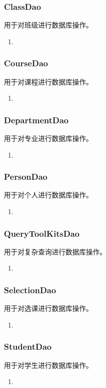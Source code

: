 \documentclass[../report.tex]{subfiles}
\begin{document}
\subsubsection{ClassDao}
用于对班级进行数据库操作。
\begin{enumerate}
\itemsep 0em
\item 
\end{enumerate}
\subsubsection{CourseDao}
用于对课程进行数据库操作。
\begin{enumerate}
\itemsep 0em
\item 
\end{enumerate}
\subsubsection{DepartmentDao}
用于对专业进行数据库操作。
\begin{enumerate}
\itemsep 0em
\item 
\end{enumerate}
\subsubsection{PersonDao}
用于对个人进行数据库操作。
\begin{enumerate}
\itemsep 0em
\item 
\end{enumerate}
\subsubsection{QueryToolKitsDao}
用于对复杂查询进行数据库操作。
\begin{enumerate}
\itemsep 0em
\item 
\end{enumerate}
\subsubsection{SelectionDao}
用于对选课进行数据库操作。
\begin{enumerate}
\itemsep 0em
\item 
\end{enumerate}
\subsubsection{StudentDao}
用于对学生进行数据库操作。
\begin{enumerate}
\itemsep 0em
\item 
\end{enumerate}
\end{document}
